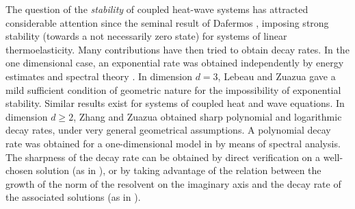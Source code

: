 \documentclass[10pt]{article}
\begin{document}
The question of the \textit{stability} of coupled heat-wave systems has attracted considerable attention since the seminal result of Dafermos \cite[Theorem 5.2]{dafermos}, imposing strong stability (towards a not necessarily zero state) for systems of linear thermoelasticity. Many contributions have then tried to obtain decay rates. In the one dimensional case, an exponential rate was obtained independently by energy estimates and spectral theory \cite{slemrod,hansen_stbl}. In dimension $d=3$, Lebeau and Zuazua \cite{lebeau_zuazua_stbl} gave a mild sufficient condition of geometric nature for the impossibility of exponential stability. Similar results exist for systems of coupled heat and wave equations. In dimension $d \geq 2$, Zhang and Zuazua \cite{zhang_zuazua_arma} obtained sharp polynomial and logarithmic decay rates, under very general geometrical assumptions. A polynomial decay rate was obtained for a one-dimensional model in \cite{Zhang_Zuazua} by means of spectral analysis. The sharpness of the decay rate can be obtained by direct verification on a well-chosen solution (as in \cite{zhang_zuazua_arma}), or by taking advantage of the relation between the growth of the norm of the resolvent on the imaginary axis and the decay rate of the associated solutions \cite{batty_tomilov} (as in \cite{avalos_lasiecka_heat_wave, batty_paunonen}). 
\end{document}
